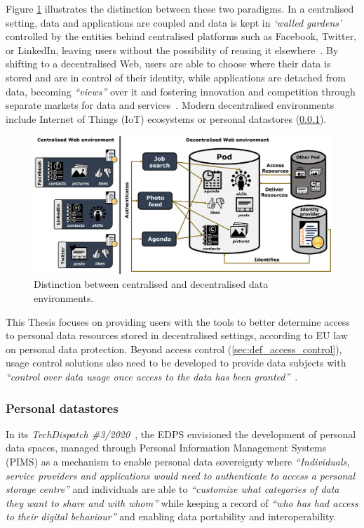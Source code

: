 Figure \ref{fig:decentralisation} illustrates the distinction between these two paradigms.
In a centralised setting, data and applications are coupled and data is kept in \textit{`walled gardens'} controlled by the entities behind centralised platforms such as Facebook, Twitter, or LinkedIn, leaving users without the possibility of reusing it elsewhere~\citeyearpar{noauthor_break_2008}.
By shifting to a decentralised Web, users are able to choose where their data is stored and are in control of their identity, while applications are detached from data, becoming \textit{``views''} over it and fostering innovation and competition through separate markets for data and services~\citep{verborgh_re-decentralizing_2022}.
Modern decentralised environments include Internet of Things (IoT) ecosystems or personal datastores (\ref{sec:def_pds}).

\begin{figure}[ht]
    \centering
    \includegraphics[width=\linewidth]{figures/chapter-1/decentralisation.png}
    \caption{Distinction between centralised and decentralised data environments.}
    \label{fig:decentralisation}
\end{figure}

This Thesis focuses on providing users with the tools to better determine access to personal data resources stored in decentralised settings, according to EU law on personal data protection.
Beyond access control (\ref{sec:def_access_control}), usage control solutions also need to be developed to provide data subjects with \textit{``control over data usage once access to the data has been granted''}~\citep{akaichi_semantic_2022}.

\subsubsection{Personal datastores}
\label{sec:def_pds}

In its \textit{TechDispatch \#3/2020}~\citep{european_data_protection_supervisor_techdispatch_2021}, the EDPS envisioned the development of personal data spaces, managed through Personal Information Management Systems (PIMS) as a mechanism to enable personal data sovereignty where \textit{``Individuals, service providers and applications would need to authenticate to access a personal storage centre''} and individuals are able to \textit{``customize what categories of data they want to share and with whom''} while keeping a record of \textit{``who has had access to their digital behaviour''} and enabling data portability and interoperability.

